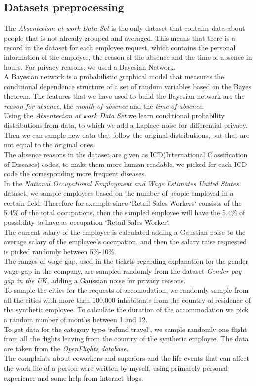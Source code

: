 \subsection{Datasets preprocessing}
The \textit{Absenteeism at work Data Set} is the only dataset that contains data about people that is not already grouped and averaged. This means that there is a record in the dataset for each employee request, which contains the personal information of the employee, the reason of the absence and the time of absence in hours. For privacy reasons, we used a Bayesian Network. \\ 
A Bayesian network is a probabilistic graphical model that measures the conditional dependence structure of a set of random variables based on the Bayes theorem. The features that we have used to build the Bayesian network are the \textit{reason for absence}, the \textit{month of absence} and the \textit{time of absence}.
\\
Using the \textit{Absenteeism at work Data Set} we learn conditional probability distributions from data, to which we add a Laplace noise for differential privacy. Then we can sample new data that follow the original distributions, but that are not equal to the original ones. \\
The absence reasons in the dataset are given as ICD(International Classification of Diseases) codes, to make them more human readable, we picked for each ICD code the corresponding more frequent diseases. \\
In the \textit{National Occupational Employment and Wage Estimates United States} dataset, we sample employees based on the number of people employed in a certain field. Therefore for example since `Retail Sales Workers` consists of the 5.4\% of the total occupations, then the sampled employee will have the 5.4\% of possibility to have as occupation `Retail Sales Worker`. \\
The current salary of the employee is calculated adding a Gaussian noise to the average salary of the employee's occupation, and then the salary raise requested is picked randomly between 5\%-10\%. \\
The ranges of wage gap, used in the tickets regarding explanation for the gender wage gap in the company, are sampled randomly from the dataset \textit{Gender pay gap in the UK}, adding a Gaussian noise for privacy reasons. \\
To sample the cities for the requests of accomodation, we randomly sample from all the cities with more than 100,000 inhabitants from the country of residence of the synthetic employee. To calculate the duration of the accommodation we pick a random number of months between 1 and 12. \\
To get data for the category type `refund travel`, we sample randomly one flight from all the flights leaving from the country of the synthetic employee. The data are taken from the \textit{OpenFlights database}. \\
The complaints about coworkers and superiors and the life events that can affect the work life of a person were written by myself, using primarely personal experience and some help from internet blogs.